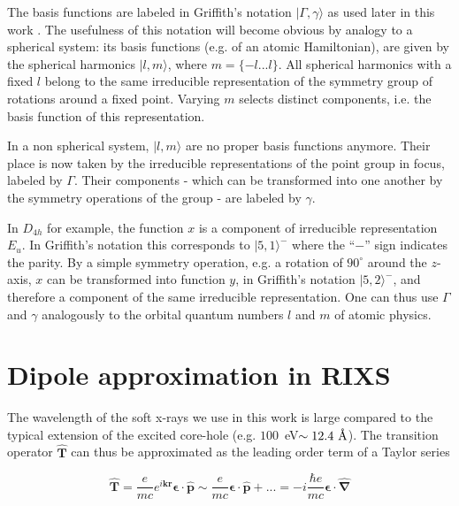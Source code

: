 \documentclass[twocolumn,prb,twocolumn,amsmath,superscriptaddress,nofootinbib,amssymb]{revtex4-1}
\newcommand{\vect}[1]{\boldsymbol{#1}}
\newcommand{\angstrom}{\textup{\AA}}
\begin{document}
\begin{widetext}
The basis functions are labeled in Griffith's notation $|\Gamma,\gamma\rangle$ as used later in this work \cite{Griffith}. The usefulness of this notation will become obvious by analogy to a spherical system: its basis functions (e.g. of an atomic Hamiltonian), are given by the spherical harmonics $|l,m\rangle$, where $m=\{-l...l\}$. All spherical harmonics with a fixed $l$ belong to the same irreducible representation of the symmetry group of rotations around a fixed point. Varying $m$ selects distinct components, i.e. the basis function of this representation.

In a non spherical system, $|l,m\rangle$ are no proper basis functions anymore. Their place is now taken by the irreducible representations of the point group in focus, labeled by $\Gamma$. Their components - which can be transformed into one another by the symmetry operations of the group - are labeled by $\gamma$.

In $D_{4h}$ for example, the function $x$ is a component of irreducible representation $E_{u}$. In Griffith's notation this corresponds to $|5,1\rangle^-$ where the ``$-$'' sign indicates the parity. By a simple symmetry operation, e.g. a rotation of $90^{\circ}$ around the $z$-axis, $x$ can be transformed into function $y$, in Griffith's notation $|5,2\rangle^-$, and therefore a component of the same irreducible representation. One can thus use $\Gamma$ and $\gamma$ analogously to the orbital quantum numbers $l$ and $m$ of atomic physics.


\section{Dipole approximation in RIXS}

The wavelength of the soft x-rays we use in this work is large compared to the typical extension of the excited core-hole (e.g. $100$~eV$\sim12.4~\angstrom$). The transition operator $\hat{\vect{T}}$ can thus be approximated as the leading order term of a Taylor series

\begin{equation}
\hat{\vect{T}}=\frac{e}{m c}e^{i\vect{k}\vect{r}}\vect{\epsilon}\cdot \hat{\vect{p}}  \sim \frac{e}{m c} \vect{\epsilon}\cdot \hat{\vect{p}}+...=-i \frac{\hbar e}{m c} \vect{\epsilon}\cdot \hat{\vect{\nabla}}
\end{equation}


\end{widetext}
\end{document}
